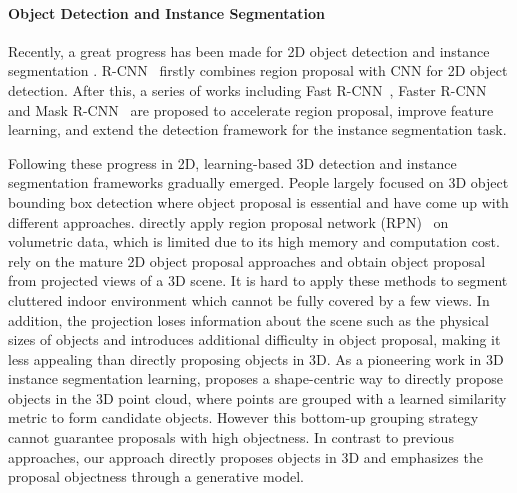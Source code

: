 \documentclass[10pt,twocolumn,letterpaper]{article}
\begin{document}
\paragraph{Object Detection and Instance Segmentation}
Recently, a great progress has been made for 2D object detection \cite{girshick2015fast, ren2015faster, redmon2016you, lin2017feature, lin2018focal, liu2016ssd} and instance segmentation \cite{dai2016instance, he2017mask, li2016fully, pinheiro2016learning}. R-CNN~\cite{girshick2014rich} firstly combines region proposal with CNN for 2D object detection. After this, a series of works including Fast R-CNN~\cite{girshick2015fast}, Faster R-CNN~\cite{ren2015faster} and Mask R-CNN~\cite{he2017mask} are proposed to accelerate region proposal, improve feature learning, and extend the detection framework for the instance segmentation task. 

Following these progress in 2D, learning-based 3D detection and instance segmentation frameworks gradually emerged. People largely focused on 3D object bounding box detection where object proposal is essential and have come up with different approaches. \cite{song2016deep} directly apply region proposal network (RPN)~\cite{ren2015faster} on volumetric data, which is limited due to its high memory and computation cost.
\cite{deng2017amodal, qi2017frustum, zhou2017voxelnet, chen2017multi, yang2018pixor, mousavian20173d} rely on the mature 2D object proposal approaches and obtain object proposal from projected views of a 3D scene. It is hard to apply these methods to segment cluttered indoor environment which cannot be fully covered by a few views. In addition, the projection loses information about the scene such as the physical sizes of objects and introduces additional difficulty in object proposal, making it less appealing than directly proposing objects in 3D. 
As a pioneering work in 3D instance segmentation learning, \cite{wang2018sgpn} proposes a shape-centric way to directly propose objects in the 3D point cloud, where points are grouped with a learned similarity metric to form candidate objects. However this bottom-up grouping strategy cannot guarantee proposals with high objectness. In contrast to previous approaches, our approach directly proposes objects in 3D and emphasizes the proposal objectness through a generative model.

\vspace{-\baselineskip}
\end{document}
